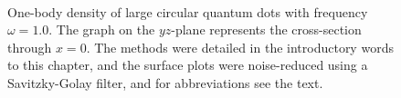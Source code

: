 \begin{figure}[H]
	\centering
	\captionsetup[subfigure]{labelformat=empty}
	\\
	\caption{One-body density of large circular quantum dots with frequency $\omega=1.0$. The graph on the $yz$-plane represents the cross-section through $x=0$. The methods were detailed in the introductory words to this chapter, and the surface plots were noise-reduced using a Savitzky-Golay filter, and for abbreviations see the text.}
	\label{fig:largedotsOB}
\end{figure}

